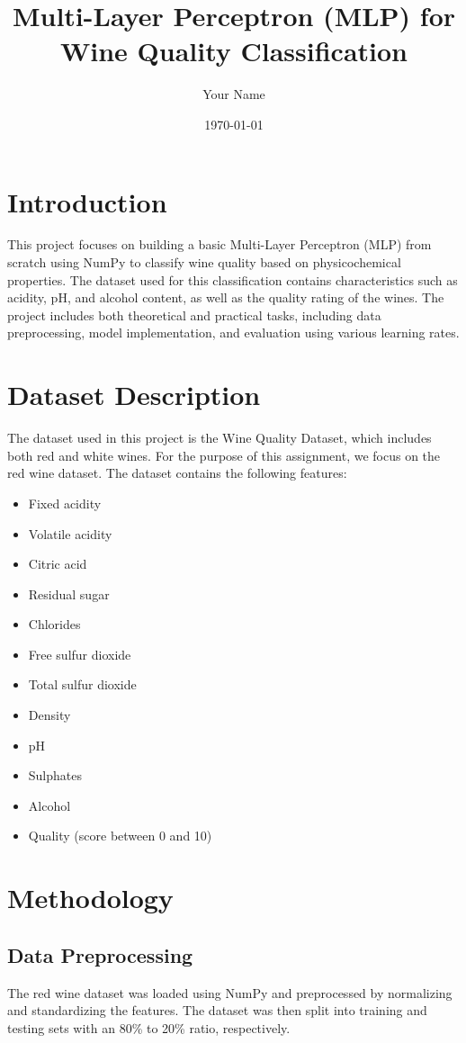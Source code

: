 \documentclass[12pt]{article}
\title{Multi-Layer Perceptron (MLP) for Wine Quality Classification}
\author{Your Name}
\date{\today}
\begin{document}
\maketitle

\section{Introduction}
This project focuses on building a basic Multi-Layer Perceptron (MLP) from scratch using NumPy to classify wine quality based on physicochemical properties. The dataset used for this classification contains characteristics such as acidity, pH, and alcohol content, as well as the quality rating of the wines. The project includes both theoretical and practical tasks, including data preprocessing, model implementation, and evaluation using various learning rates.

\section{Dataset Description}
The dataset used in this project is the Wine Quality Dataset, which includes both red and white wines. For the purpose of this assignment, we focus on the red wine dataset. The dataset contains the following features:

\begin{itemize}
    \item Fixed acidity
    \item Volatile acidity
    \item Citric acid
    \item Residual sugar
    \item Chlorides
    \item Free sulfur dioxide
    \item Total sulfur dioxide
    \item Density
    \item pH
    \item Sulphates
    \item Alcohol
    \item Quality (score between 0 and 10)
\end{itemize}

\section{Methodology}
\subsection{Data Preprocessing}
The red wine dataset was loaded using NumPy and preprocessed by normalizing and standardizing the features. The dataset was then split into training and testing sets with an 80\% to 20\% ratio, respectively.
\end{document}
